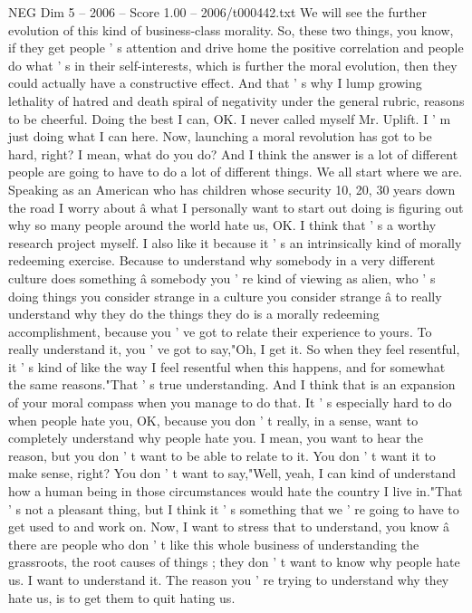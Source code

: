 \begin{textsample}{NEG Dim 5 – 2006 – Score 1.00 – 2006/t000442.txt}
We will see the further evolution of this kind of business-class morality.
So, these two things, you know, if they get people ' s attention and drive home the positive correlation and people do what ' s in their self-interests, which is further the moral evolution, then they could actually have a constructive effect.
And that ' s why I lump growing lethality of hatred and death spiral of negativity under the general rubric, reasons to be cheerful.
Doing the best I can, OK.
I never called myself Mr.
Uplift.
I ' m just doing what I can here.
Now, launching a moral revolution has got to be hard, right?
I mean, what do you do?
And I think the answer is a lot of different people are going to have to do a lot of different things.
We all start where we are.
Speaking as an American who has children whose security 10, 20, 30 years down the road I worry about â what I personally want to start out doing is figuring out why so many people around the world hate us, OK.
I think that ' s a worthy research project myself.
I also like it because it ' s an intrinsically kind of morally redeeming exercise.
Because to understand why somebody in a very different culture does something â somebody you ' re kind of viewing as alien, who ' s doing things you consider strange in a culture you consider strange â to really understand why they do the things they do is a morally redeeming accomplishment, because you ' ve got to relate their experience to yours.
To really understand it, you ' ve got to say,"Oh, I get it.
So when they feel resentful, it ' s kind of like the way I feel resentful when this happens, and for somewhat the same reasons."That ' s true understanding.
And I think that is an expansion of your moral compass when you manage to do that.
It ' s especially hard to do when people hate you, OK, because you don ' t really, in a sense, want to completely understand why people hate you.
I mean, you want to hear the reason, but you don ' t want to be able to relate to it.
You don ' t want it to make sense, right?
You don ' t want to say,"Well, yeah, I can kind of understand how a human being in those circumstances would hate the country I live in."That ' s not a pleasant thing, but I think it ' s something that we ' re going to have to get used to and work on.
Now, I want to stress that to understand, you know â there are people who don ' t like this whole business of understanding the grassroots, the root causes of things ; they don ' t want to know why people hate us.
I want to understand it.
The reason you ' re trying to understand why they hate us, is to get them to quit hating us.

\end{textsample}

